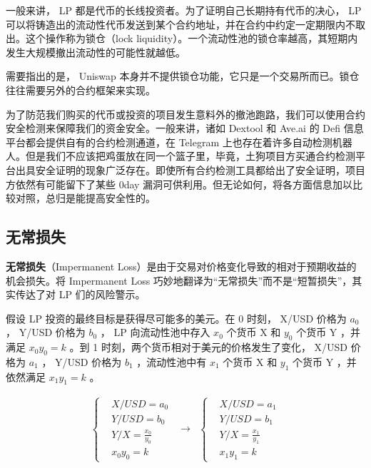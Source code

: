 \documentclass[12pt, a4paper, oneside]{ctexart}
\begin{document}
一般来讲， LP 都是代币的长线投资者。为了证明自己长期持有代币的决心， LP 可以将铸造出的流动性代币发送到某个合约地址，并在合约中约定一定期限内不取出。这个操作称为锁仓（lock liquidity）。一个流动性池的锁仓率越高，其短期内发生大规模撤出流动性的可能性就越低。

需要指出的是， Uniswap 本身并不提供锁仓功能，它只是一个交易所而已。锁仓往往需要另外的合约框架来实现。

为了防范我们购买的代币或投资的项目发生意料外的撤池跑路，我们可以使用合约安全检测来保障我们的资金安全。一般来讲，诸如 Dextool 和 Ave.ai 的 Defi 信息平台都会提供自有的合约检测通道，在 Telegram 上也存在着许多自动检测机器人。但是我们不应该把鸡蛋放在同一个篮子里，毕竟，土狗项目方买通合约检测平台出具安全证明的现象广泛存在。即使所有合约检测工具都给出了安全证明，项目方依然有可能留下了某些 0day 漏洞可供利用。但无论如何，将各方面信息加以比较对照，总归是能提高安全性的。

\subsection{无常损失}

\textbf{无常损失}（Impermanent Loss）是由于交易对价格变化导致的相对于预期收益的机会损失。将 Impermanent Loss 巧妙地翻译为“无常损失”而不是“短暂损失”，其实传达了对 LP 们的风险警示。

假设 LP 投资的最终目标是获得尽可能多的美元。在 0 时刻， X/USD 价格为 $a_0$ ， Y/USD 价格为 $b_0$ ， LP 向流动性池中存入 $x_0$ 个货币 X 和 $y_0$ 个货币 Y ，并满足 $x_0y_0=k$ 。到 1 时刻，两个货币相对于美元的价格发生了变化， X/USD 价格为 $a_1$ ， Y/USD 价格为 $b_1$ ，流动性池中有 $x_1$ 个货币 X 和 $y_1$ 个货币 Y ，并依然满足 $x_1y_1=k$ 。

\begin{equation}
    \begin{matrix}
        \left\{ 
            \begin{aligned}
                & X/USD = a_0 \\
                & Y/USD = b_0 \\
                & Y/X = \frac{x_0}{y_0}\\
                & x_0y_0 = k
            \end{aligned}
        \right.
        & \rightarrow &
        \left\{ 
            \begin{aligned}
                & X/USD = a_1 \\
                & Y/USD = b_1 \\
                & Y/X = \frac{x_1}{y_1}\\
                & x_1y_1 = k
            \end{aligned}
        \right.
    \end{matrix}
\end{equation}
\end{document}
